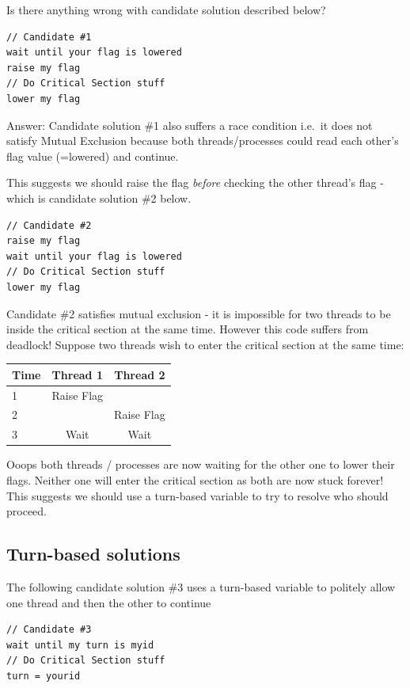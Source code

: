 Is there anything wrong with candidate solution described below?

\begin{lstlisting}
// Candidate #1
wait until your flag is lowered
raise my flag
// Do Critical Section stuff
lower my flag 
\end{lstlisting}

Answer: Candidate solution \#1 also suffers a race condition i.e.~it does not satisfy Mutual Exclusion because both threads/processes could read each other's flag value (=lowered) and continue.

This suggests we should raise the flag \emph{before} checking the other thread's flag - which is candidate solution \#2 below.

\begin{lstlisting}
// Candidate #2
raise my flag
wait until your flag is lowered
// Do Critical Section stuff
lower my flag 
\end{lstlisting}

Candidate \#2 satisfies mutual exclusion - it is impossible for two threads to be inside the critical section at the same time. However this code suffers from deadlock! Suppose two threads wish to enter the critical section at the same time:

\begin{tabular}{|l|c|c|}
Time & Thread 1 & Thread 2 \\ \hline
1 & Raise Flag & \\
2 & & Raise Flag \\
3 & Wait & Wait \\
\end{tabular}

Ooops both threads / processes are now waiting for the other one to lower their flags. Neither one will enter the critical section as both are now stuck forever! This suggests we should use a turn-based variable to try to resolve who should proceed.

\subsection{Turn-based solutions}\label{turn-based-solutions}

The following candidate solution \#3 uses a turn-based variable to politely allow one thread and then the other to continue

\begin{lstlisting}
// Candidate #3
wait until my turn is myid
// Do Critical Section stuff
turn = yourid
\end{lstlisting}

